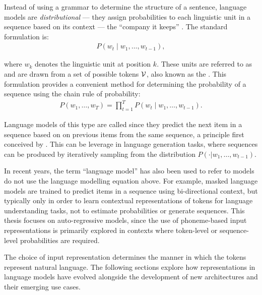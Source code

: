 
Instead of using a grammar to determine the structure of a sentence, language models are \emph{distributional} --- they assign probabilities to each linguistic unit in a sequence based on its context --- the ``company it keeps'' \citep{firth1957synopsis}. The standard formulation is:
\begin{align}
    P\left(w_t \mid w_1, \dots, w_{t-1} \right), \label{eq:languagemodel}
\end{align}

where $w_k$ denotes the linguistic unit at position $k$. These units are referred to as  and are drawn from a set of possible tokens $\mathcal{V}$, also known as the . This formulation provides a convenient method for determining the probability of a sequence using the chain rule of probability:
\begin{align}
    P(w_1, \dots, w_T) = \prod_{t=1}^{T} P\left(w_t \mid w_1, \dots, w_{t-1}\right).
\end{align}


Language models of this type are called  since they predict the next item in a sequence based on on previous items from the same sequence, a principle first conceived by \citet{shannon1948mathematical}. This can be leverage in language generation tasks, where sequences can be produced by iteratively sampling from the distribution $P(\cdot | w_1, \dots, w_{t-1})$.


In recent years, the term ``language model'' has also been used to refer to models do not use the language modelling equation above. For example, masked language models \citep[MLM;][]{devlin2019bert} are trained to predict items in a sequence using bi-directional context, but typically only in order to learn contextual representations of tokens for language understanding tasks, not to estimate probabilities or generate sequences. This thesis focuses on auto-regressive models, since the use of phoneme-based input representations is primarily explored in contexts where token-level or sequence-level probabilities are required.

The choice of input representation determines the manner in which the tokens represent natural language. %
The following sections explore how representations in language models have evolved alongside the development of new architectures and their emerging use cases.

